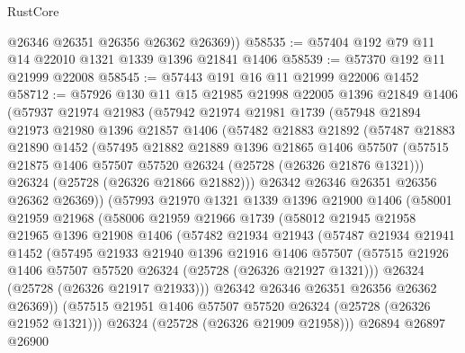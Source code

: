 \begin{lexlean}{RustCore}
\begin{coremodule}
        @26346
        @26351
        @26356
        @26362
        @26369))
@58535 := @57404 @192 @79 @11 @14 @22010 @1321 @1339 @1396 @21841 @1406
@58539 := @57370 @192 @11 @21999 @22008
@58545 := @57443 @191 @16 @11 @21999 @22006 @1452
@58712 := @57926
    @130
    @11
    @15
    @21985
    @21998
    @22005
    @1396
    @21849
    @1406
    (@57937
      @21974
      @21983
      (@57942
        @21974
        @21981
        @1739
        (@57948
          @21894
          @21973
          @21980
          @1396
          @21857
          @1406
          (@57482
            @21883
            @21892
            (@57487
              @21883
              @21890
              @1452
              (@57495
                @21882
                @21889
                @1396
                @21865
                @1406
                @57507
                (@57515 @21875 @1406 @57507 @57520 @26324 (@25728 (@26326 @21876 @1321)))
                @26324
                (@25728 (@26326 @21866 @21882)))
              @26342
              @26346
              @26351
              @26356
              @26362
              @26369))
          (@57993
            @21970
            @1321
            @1339
            @1396
            @21900
            @1406
            (@58001
              @21959
              @21968
              (@58006
                @21959
                @21966
                @1739
                (@58012
                  @21945
                  @21958
                  @21965
                  @1396
                  @21908
                  @1406
                  (@57482
                    @21934
                    @21943
                    (@57487
                      @21934
                      @21941
                      @1452
                      (@57495
                        @21933
                        @21940
                        @1396
                        @21916
                        @1406
                        @57507
                        (@57515 @21926 @1406 @57507 @57520 @26324 (@25728 (@26326 @21927 @1321)))
                        @26324
                        (@25728 (@26326 @21917 @21933)))
                      @26342
                      @26346
                      @26351
                      @26356
                      @26362
                      @26369))
                  (@57515 @21951 @1406 @57507 @57520 @26324 (@25728 (@26326 @21952 @1321)))
                  @26324
                  (@25728 (@26326 @21909 @21958)))
                @26894
                @26897
                @26900

\end{coremodule}
\end{lexlean}
